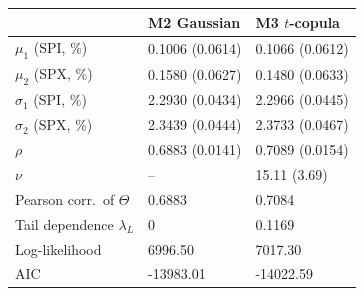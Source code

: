 \begin{tabular}{lll}
\toprule
 & M2 Gaussian & M3 $t$-copula \\
\midrule
$\mu_1$ (SPI, \%) & 0.1006 (0.0614) & 0.1066 (0.0612) \\
$\mu_2$ (SPX, \%) & 0.1580 (0.0627) & 0.1480 (0.0633) \\
$\sigma_1$ (SPI, \%) & 2.2930 (0.0434) & 2.2966 (0.0445) \\
$\sigma_2$ (SPX, \%) & 2.3439 (0.0444) & 2.3733 (0.0467) \\
$\rho$ & 0.6883 (0.0141) & 0.7089 (0.0154) \\
$\nu$ & -- & 15.11 (3.69) \\
Pearson corr.\ of $\Theta$ & 0.6883 & 0.7084 \\
Tail dependence $\lambda_L$ & 0 & 0.1169 \\
Log-likelihood & 6996.50 & 7017.30 \\
AIC & -13983.01 & -14022.59 \\
\bottomrule
\end{tabular}
